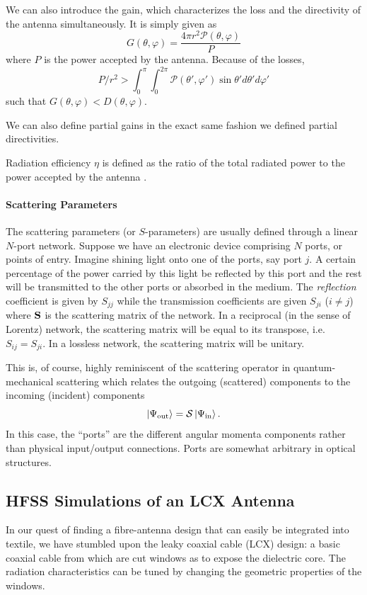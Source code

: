 We can also introduce the gain, which characterizes the loss
and the directivity of the antenna simultaneously. It is simply given
as
  \begin{equation}
    G(\theta,\varphi) = \frac{4\pi r^2\mathcal{P}(\theta,\varphi)}{P}
  \end{equation}
where $P$ is the power accepted by the antenna. Because of the 
losses, 
	\begin{equation*}
		P/r^2>\int_0^\pi\int_0^{2\pi}\mathcal{P}(\theta',\varphi')\sin\theta'd\theta'd\varphi'
	\end{equation*}
such that $G(\theta,\varphi)<D(\theta,\varphi)$. 

We can also define partial gains in the exact same fashion we defined partial
directivities.

Radiation efficiency $\eta$ is defined as the ratio of the total radiated power 
to the power accepted by the antenna \cite{IEEE145-1993}.

\paragraph{Scattering Parameters}
The scattering parameters (or $S$-parameters) are
usually defined through a linear $N$-port network. 
Suppose we have an electronic device comprising
$N$ ports, or points of entry. Imagine shining light onto
one of the ports, say port $j$. A certain percentage
of the power carried by this light be reflected 
by this port and the rest will be transmitted to the
other ports or absorbed in the medium. The \textit{reflection}
coefficient is given by $S_{jj}$ while the transmission
coefficients are given $S_{ji}$ ($i\neq j$) where $\mathbf{S}$
is the scattering matrix of the network. In a reciprocal (in the sense
of Lorentz) network, the scattering matrix will be equal to its
transpose, i.e. $S_{ij}=S_{ji}$. In a lossless network, the scattering
matrix will be unitary. 

This is, of course, highly reminiscent of the scattering operator
in quantum-mechanical scattering which relates the outgoing (scattered)
components to the incoming (incident) components
  \begin{equation}
   \Ket{\Psi_\text{out}}=\mathcal{S}\Ket{\Psi_\text{in}}.
  \end{equation}
In this case, the ``ports'' are the different angular momenta
components rather than physical input/output connections. 
Ports are somewhat arbitrary in optical structures.

\subsection{HFSS Simulations of an LCX Antenna}
In our quest of finding a fibre-antenna design that can easily be integrated into
textile, we have stumbled upon the leaky coaxial cable (LCX) design: a basic coaxial cable
from which are cut windows as to expose the dielectric core. The radiation characteristics
can be tuned by changing the geometric properties of the windows. 

